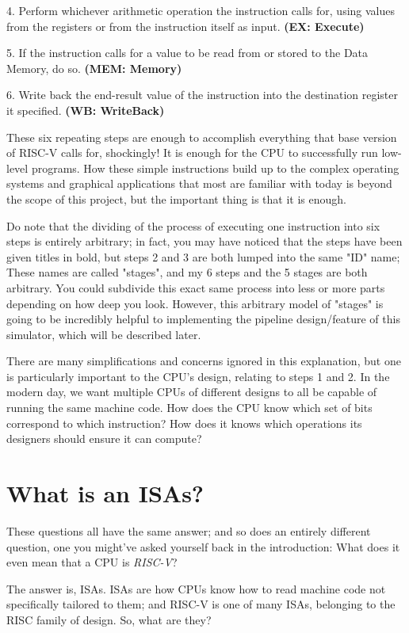 \documentclass[12pt,twoside]{reedthesis}
\begin{document}
4. Perform whichever arithmetic operation the instruction calls for, using values from the registers or from the instruction itself as input. \textbf{(EX: Execute)}

5. If the instruction calls for a value to be read from or stored to the Data Memory, do so. \textbf{(MEM: Memory)}

6. Write back the end-result value of the instruction into the destination register it specified. \textbf{(WB: WriteBack)}

These six repeating steps are enough to accomplish everything that base version of RISC-V calls for, shockingly! It is enough for the CPU to successfully run low-level programs. How these simple instructions build up to the complex operating systems and graphical applications that most are familiar with today is beyond the scope of this project, but the important thing is that it is enough.

Do note that the dividing of the process of executing one instruction into six steps is entirely arbitrary; in fact, you may have noticed that the steps have been given titles in bold, but steps 2 and 3 are both lumped into the same "ID" name; These names are called "stages", and my 6 steps and the 5 stages are both arbitrary. You could subdivide this exact same process into less or more parts depending on how deep you look. However, this arbitrary model of "stages" is going to be incredibly helpful to implementing the pipeline design/feature of this simulator, which will be described later.

There are many simplifications and concerns ignored in this explanation, but one is particularly important to the CPU's design, relating to steps 1 and 2. In the modern day, we want multiple CPUs of different designs to all be capable of running the same machine code. How does the CPU know which set of bits correspond to which instruction? How does it knows which operations its designers should ensure it can compute?

\section{What is an ISAs?}

These questions all have the same answer; and so does an entirely different question, one you might've asked yourself back in the introduction: What does it even mean that a CPU is \textit{RISC-V}?

The answer is, ISAs. ISAs are how CPUs know how to read machine code not specifically tailored to them; and RISC-V is one of many ISAs, belonging to the RISC family of design. So, what are they?
\end{document}
